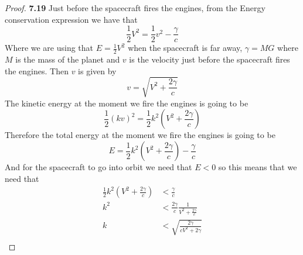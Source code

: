 \documentclass[11pt]{article}
\theoremstyle{definition}
\begin{document}
	\begin{proof}{\textbf{7.19}}
        Just before the spacecraft fires the engines, from the Energy conservation
        expression we have that
        $$\frac{1}{2}V^2 = \frac{1}{2}v^2 - \frac{\gamma}{c}$$
        Where we are using that $E = \frac{1}{2}V^2$ when the spacecraft is far away,
        $\gamma = MG$ where $M$ is the mass of the planet and $v$ is the velocity
        just before the spacecraft fires the engines. Then $v$ is given by
        $$v = \sqrt{V^2 + \frac{2\gamma}{c}}$$
        The kinetic energy at the moment we fire the engines is going to be
        $$\frac{1}{2}(kv)^2 = \frac{1}{2}k^2(V^2 + \frac{2\gamma}{c})$$
        Therefore the total energy at the moment we fire the engines is going to be
        $$E = \frac{1}{2}k^2(V^2 + \frac{2\gamma}{c}) - \frac{\gamma}{c}$$
        And for the spacecraft to go into orbit we need that $E < 0$ so this means that
        we need that
        \begin{align*}
            \frac{1}{2}k^2(V^2 + \frac{2\gamma}{c}) &< \frac{\gamma}{c}\\
            k^2 &< \frac{2\gamma}{c}\frac{1}{V^2 + \frac{2\gamma}{c}}\\
            k &< \sqrt{\frac{2\gamma}{cV^2 + 2\gamma}}\\
        \end{align*}
    \end{proof}
\cleardoublepage
\end{document}
